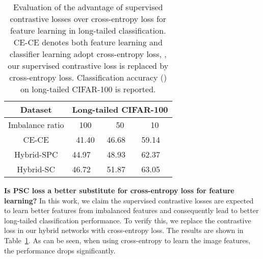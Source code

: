 \documentclass[final]{cvpr}
\begin{document}
\begin{table}[t]
\footnotesize
\center
\caption{Evaluation of the advantage of supervised contrastive losses over cross-entropy loss for feature learning in long-tailed classification. CE-CE denotes both feature learning and classifier learning adopt cross-entropy loss, \ie, our supervised contrastive loss is replaced by cross-entropy loss. Classification accuracy () on long-tailed CIFAR-100 is reported.}
\vspace{0.5em}
\label{tab:ce-baseline}
\begin{tabular}{|c||c|l|l|}
\hline
Dataset            & \multicolumn{3}{c|}{Long-tailed CIFAR-100}                                     \\ \hline
Imbalance ratio    & 100                        & \multicolumn{1}{c|}{50} & \multicolumn{1}{c|}{10} \\ \hline \hline
CE-CE              & 41.40                       & 46.68                   & 59.14                   \\ \hline
Hybrid-SPC         & \multicolumn{1}{l|}{44.97} & 48.93                   & 62.37                   \\ \hline
Hybrid-SC & \multicolumn{1}{l|}{46.72} & 51.87                   & 63.05                   \\ \hline
\end{tabular}
\end{table}
\par{\textbf{Is PSC loss a better substitute for cross-entropy loss for feature learning?} } In this work, we claim the supervised contrastive losses are expected to learn better features from imbalanced features and consequently lead to better long-tailed classification performance. To verify this, we replace the contrastive loss in our hybrid networks with cross-entropy loss. The results are shown in Table~\ref{tab:ce-baseline}. As can be seen, when using cross-entropy to learn the image features, the performance drops significantly. 
\end{document}

